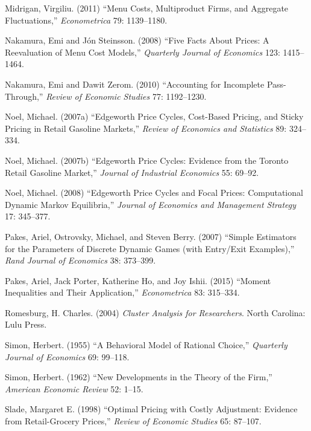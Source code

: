 \documentclass[11pt]{article}
\begin{document}
\begin{description}
\item Midrigan, Virgiliu. (2011) ``Menu Costs, Multiproduct Firms, and
  Aggregate Fluctuations,'' {\it Econometrica} 79: 1139--1180.

\item Nakamura, Emi and J\'on Steinsson.  (2008) ``Five Facts About
  Prices: A Reevaluation of Menu Cost Models,'' {\it Quarterly Journal
    of Economics} 123: 1415--1464.

\item Nakamura, Emi and Dawit Zerom. (2010) ``Accounting for
  Incomplete Pass-Through,'' {\it Review of Economic Studies} 77:
  1192--1230.

\item Noel, Michael. (2007a) ``Edgeworth Price Cycles, Cost-Based
  Pricing, and Sticky Pricing in Retail Gasoline Markets,'' {\it
    Review of Economics and Statistics} 89: 324--334.

\item Noel, Michael. (2007b) ``Edgeworth Price Cycles: Evidence from
  the Toronto Retail Gasoline Market,'' {\it Journal of Industrial
    Economics} 55: 69--92.

\item Noel, Michael. (2008) ``Edgeworth Price Cycles and Focal Prices:
  Computational Dynamic Markov Equilibria,'' {\em Journal of Economics
    and Management Strategy} 17: 345--377.

\item Pakes, Ariel, Ostrovsky, Michael, and Steven Berry. (2007)
  ``Simple Estimators for the Parameters of Discrete Dynamic Games
  (with Entry/Exit Examples),'' {\em Rand Journal of Economics} 38:
  373--399.

\item Pakes, Ariel, Jack Porter, Katherine Ho, and Joy Ishii. (2015)
  ``Moment Inequalities and Their Application,'' {\it Econometrica}
  83: 315--334.

\item Romesburg, H. Charles. (2004) {\it Cluster Analysis for
  Researchers}. North Carolina: Lulu Press.

\item Simon, Herbert. (1955) ``A Behavioral Model of Rational
  Choice,'' {\it Quarterly Journal of Economics} 69: 99--118.

\item Simon, Herbert. (1962) ``New Developments in the Theory of the
  Firm,'' {\it American Economic Review} 52: 1--15.

\item Slade, Margaret E. (1998) ``Optimal Pricing with Costly
  Adjustment: Evidence from Retail-Grocery Prices,'' {\it Review of
    Economic Studies} 65: 87--107.


\end{description}
\end{document}
